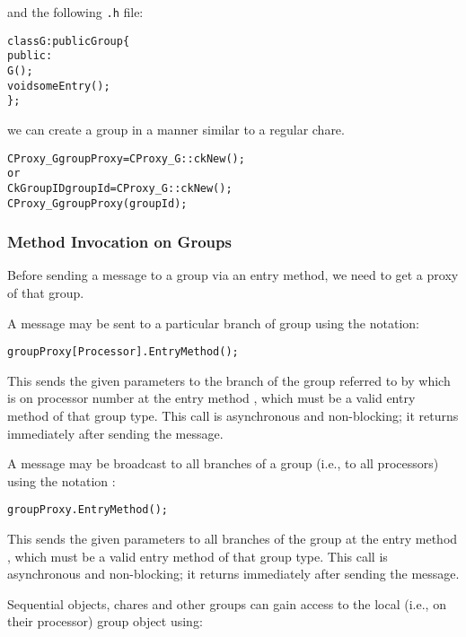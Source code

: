 and the following \texttt{.h} file:

\begin{alltt}
class G : public Group \{
  public:
    G();
    void someEntry();
\};
\end{alltt}

we can create a group in a manner similar to a regular
chare. 

\begin{alltt}
CProxy_G groupProxy = CProxy_G::ckNew();
or
CkGroupID groupId = CProxy_G::ckNew();
CProxy_G groupProxy(groupId);
\end{alltt}

\subsubsection{Method Invocation on Groups}

Before sending a message to a group via an entry
method, we need to get a proxy of that group.

A message may be sent to a particular branch of group using the
notation:

\begin{alltt}
 groupProxy[Processor].EntryMethod();
\end{alltt}

This sends the given parameters to the branch of
the group referred to by  which is on processor number
 at the entry method , which must be a valid
entry method of that group type. This call is asynchronous and non-blocking; it
returns immediately after sending the message.

A message may be broadcast  to all branches of a group
(i.e., to all processors) using the notation :

\begin{alltt}
 groupProxy.EntryMethod();
\end{alltt}

This sends the given parameters to all branches of the group at
the entry method , which must be a valid entry method of that
group type. This call is asynchronous and non-blocking; it returns immediately
after sending the message.


Sequential objects, chares and other groups can gain access to the local
(i.e., on their processor) group object using:

